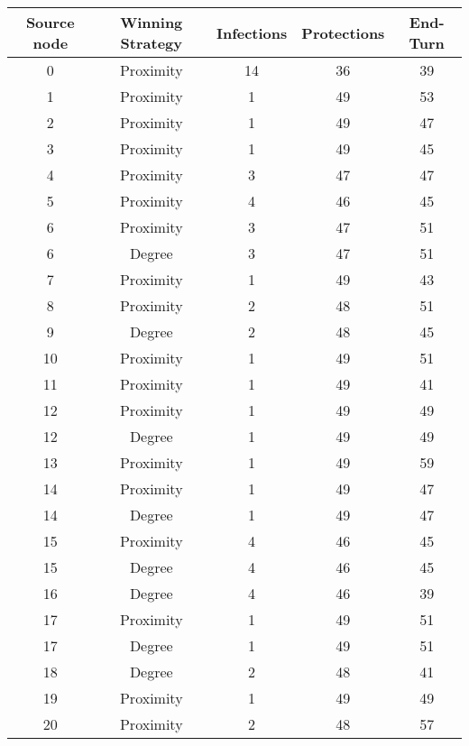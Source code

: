 \documentclass[results.tex]{subfiles}
\begin{document}
\begin{center}
  \begin{tabular}{| c || c | c | c | c |}
    \hline
    {\bfseries Source node} & {\bfseries Winning Strategy} & {\bfseries Infections} & {\bfseries Protections} & {\bfseries End-Turn} \\  %
    \hline\hline
    0 & Proximity & 14 & 36 & 39 \\ 
    \hline
    1 & Proximity & 1 & 49 & 53 \\ 
    \hline
    2 & Proximity & 1 & 49 & 47 \\ 
    \hline
    3 & Proximity & 1 & 49 & 45 \\ 
    \hline
    4 & Proximity & 3 & 47 & 47 \\ 
    \hline
    5 & Proximity & 4 & 46 & 45 \\ 
    \hline
    6 & Proximity & 3 & 47 & 51 \\ 
    \hline
    6 & Degree & 3 & 47 & 51 \\ 
    \hline
    7 & Proximity & 1 & 49 & 43 \\ 
    \hline
    8 & Proximity & 2 & 48 & 51 \\ 
    \hline
    9 & Degree & 2 & 48 & 45 \\ 
    \hline
    10 & Proximity & 1 & 49 & 51 \\ 
    \hline
    11 & Proximity & 1 & 49 & 41 \\ 
    \hline
    12 & Proximity & 1 & 49 & 49 \\ 
    \hline
    12 & Degree & 1 & 49 & 49 \\ 
    \hline
    13 & Proximity & 1 & 49 & 59 \\ 
    \hline
    14 & Proximity & 1 & 49 & 47 \\ 
    \hline
    14 & Degree & 1 & 49 & 47 \\ 
    \hline
    15 & Proximity & 4 & 46 & 45 \\ 
    \hline
    15 & Degree & 4 & 46 & 45 \\ 
    \hline
    16 & Degree & 4 & 46 & 39 \\ 
    \hline
    17 & Proximity & 1 & 49 & 51 \\ 
    \hline
    17 & Degree & 1 & 49 & 51 \\ 
    \hline
    18 & Degree & 2 & 48 & 41 \\ 
    \hline
    19 & Proximity & 1 & 49 & 49 \\ 
    \hline
    20 & Proximity & 2 & 48 & 57 \\ 
    \hline

\end{tabular}
\end{center}
\end{document}

